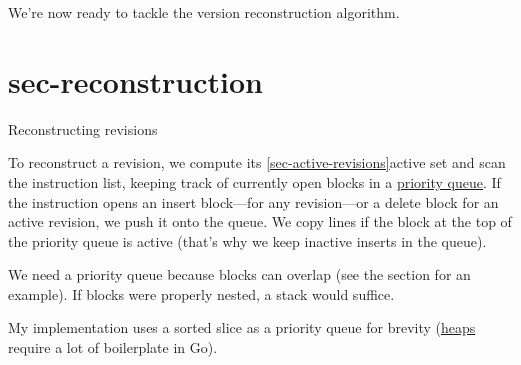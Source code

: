 \documentclass{article}
\begin{document}
We're now ready to tackle the version reconstruction algorithm.

\section{sec-reconstruction}{Reconstructing revisions}

To reconstruct a revision,
we compute its \ref{sec-active-revisions}{active set}
and scan the instruction list,
keeping track of currently open blocks in a \href{https://en.wikipedia.org/wiki/Priority_queue}{priority queue}.
If the instruction opens an insert block---for any revision---or a delete block for an active revision, we push it onto the queue.
We copy lines if the block at the top of the priority queue is active
(that's why we keep inactive inserts in the queue).

We need a priority queue because blocks can overlap (see the  section for an example).
If blocks were properly nested, a stack would suffice.

My implementation uses a sorted slice as a priority queue for brevity
(\href{https://pkg.go.dev/container/heap}{heaps} require a lot of boilerplate in Go).
\end{document}

